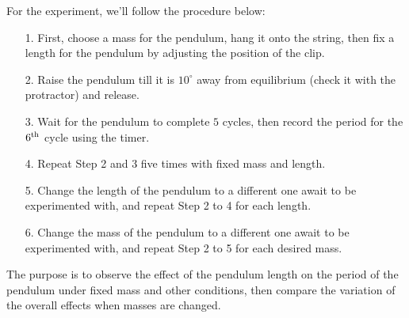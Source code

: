 \documentclass{article}
\begin{document}
For the experiment, we'll follow the procedure below:
\begin{itemize}
    \item[1.] First, choose a mass for the pendulum, hang it onto the string, then fix a length for the pendulum by adjusting the position of the clip.
    \item[2.] Raise the pendulum till it is $10^\circ$ away from equilibrium (check it with the protractor) and release.
    \item[3.] Wait for the pendulum to complete $5$ cycles, then record the period for the $6^\textmd{th}$ cycle using the timer.
    \item[4.] Repeat Step 2 and 3 five times with fixed mass and length.
    \item[5.] Change the length of the pendulum to a different one await to be experimented with, and repeat Step 2 to 4 for each length.
    \item[6.] Change the mass of the pendulum to a different one await to be experimented with, and repeat Step 2 to 5 for each desired mass.
\end{itemize}
The purpose is to observe the effect of the pendulum length on the period of the pendulum under fixed mass and other conditions, then compare the variation of the overall effects when masses are changed.

\pagebreak
\end{document}
